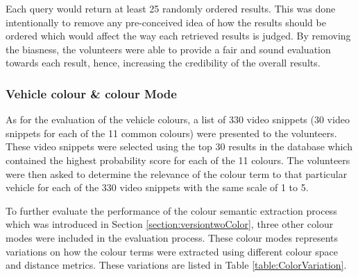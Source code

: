 Each query would return at least 25 randomly ordered results. This was done
intentionally to remove any pre-conceived idea of how the results should be
ordered which would affect the way each retrieved results is judged. By removing
the biasness, the volunteers were able to provide a fair and sound evaluation
towards each result, hence, increasing the credibility of the overall results.


\subsubsection{Vehicle colour \& colour Mode}
\label{subsec:vehColor}
As for the evaluation of the vehicle colours, a list of 330 video snippets (30
video snippets for each of the 11 common colours) were presented to the
volunteers. These video snippets were selected using the top 30 results in the
database which contained the highest probability score for each of the 11
colours. The volunteers were then asked to determine the relevance of the colour
term to that particular vehicle for each of the 330 video snippets with the same
scale of 1 to 5.

To further evaluate the performance of the colour semantic extraction process
which was introduced in Section \ref{section:versiontwoColor}, three other
colour modes were included in the evaluation process. These colour modes
represents variations on how the colour terms were extracted using different
colour space and distance metrics. These variations are listed in Table
\ref{table:ColorVariation}.

